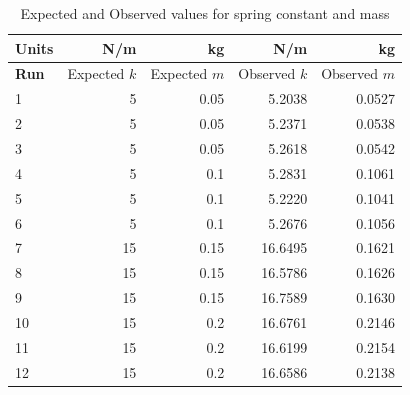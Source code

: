 %
\begin{table}[ht]
    \centering
    \begin{tabular}{l|r|r|r|r}
        \textbf{Units} & N/m & kg & N/m & kg \\
        \hline
        \textbf{Run} & Expected $k$ & Expected $m$ & Observed $k$ & Observed $m$ \\
        \hline
        1 & 5 & 0.05 & 5.2038 & 0.0527 \\
        2 & 5 & 0.05 & 5.2371 & 0.0538 \\
        3 & 5 & 0.05 & 5.2618 & 0.0542 \\
        \hline
        4 & 5 & 0.1 & 5.2831 & 0.1061 \\
        5 & 5 & 0.1 & 5.2220 & 0.1041 \\
        6 & 5 & 0.1 & 5.2676 & 0.1056 \\
        \hline
        7 & 15 & 0.15 & 16.6495 & 0.1621 \\
        8 & 15 & 0.15 & 16.5786 & 0.1626 \\
        9 & 15 & 0.15 & 16.7589 & 0.1630 \\
        \hline
        10 & 15 & 0.2 & 16.6761 & 0.2146 \\
        11 & 15 & 0.2 & 16.6199 & 0.2154 \\
        12 & 15 & 0.2 & 16.6586 & 0.2138 \\
        \hline
    \end{tabular}
    \caption{Expected and Observed values for spring constant and mass}
    \label{table.11.k.m}
\end{table}
%
